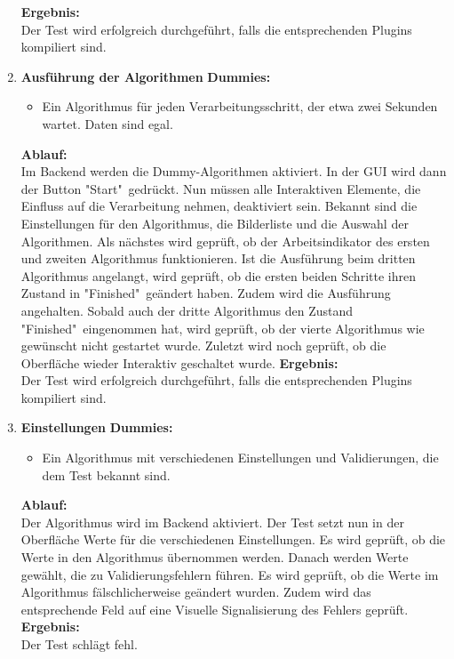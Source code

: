 \begin{enumerate}[align=left, leftmargin=4em, label={\textbf{\textbackslash T3.\arabic*\textbackslash}} ]
	\subitem\textbf{Ergebnis:}\\
	Der Test wird erfolgreich durchgeführt, falls die entsprechenden Plugins kompiliert sind.
	\\\item \textbf{Ausführung der Algorithmen}
	\subitem \textbf{Dummies:}\begin{itemize}
		\item Ein Algorithmus für jeden Verarbeitungsschritt, der etwa zwei Sekunden wartet. Daten sind egal.
	\end{itemize}
	\subitem \textbf{Ablauf:}\\ Im Backend werden die Dummy-Algorithmen aktiviert. In der GUI wird dann der Button "{}Start" gedrückt. Nun müssen alle Interaktiven Elemente, die Einfluss auf die Verarbeitung nehmen, deaktiviert sein. Bekannt sind die Einstellungen für den Algorithmus, die Bilderliste und die Auswahl der Algorithmen. Als nächstes wird geprüft, ob der Arbeitsindikator des ersten und zweiten Algorithmus funktionieren. Ist die Ausführung beim dritten Algorithmus angelangt, wird geprüft, ob die ersten beiden Schritte ihren Zustand in "{}Finished" geändert haben. Zudem wird die Ausführung angehalten. Sobald auch der dritte Algorithmus den Zustand "{}Finished" eingenommen hat, wird geprüft, ob der vierte Algorithmus wie gewünscht nicht gestartet wurde. Zuletzt wird noch geprüft, ob die Oberfläche wieder Interaktiv geschaltet wurde.
	\subitem\textbf{Ergebnis:}\\
	Der Test wird erfolgreich durchgeführt, falls die entsprechenden Plugins kompiliert sind.
	\\\item \textbf{Einstellungen}
	\subitem \textbf{Dummies:}\begin{itemize}
		\item Ein Algorithmus mit verschiedenen Einstellungen und Validierungen, die dem Test bekannt sind.
	\end{itemize}
	\subitem \textbf{Ablauf:}\\ Der Algorithmus wird im Backend aktiviert. Der Test setzt nun in der Oberfläche Werte für die verschiedenen Einstellungen. Es wird geprüft, ob die Werte in den Algorithmus übernommen werden. Danach werden Werte gewählt, die zu Validierungsfehlern führen. Es wird geprüft, ob die Werte im Algorithmus fälschlicherweise geändert wurden. Zudem wird das entsprechende Feld auf eine Visuelle Signalisierung des Fehlers geprüft.
	\subitem\textbf{Ergebnis:}\\
	Der Test schlägt fehl.
\end{enumerate}